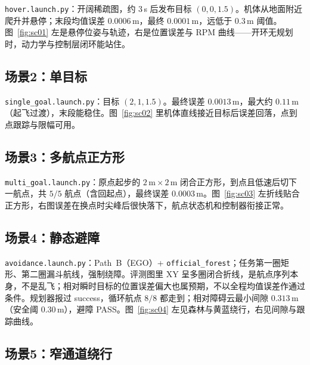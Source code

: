 \texttt{hover.launch.py}：开阔稀疏图，约 3\,s 后发布目标 $(0,0,1.5)$。机体从地面附近爬升并悬停；末段均值误差 $0.0006\,\mathrm{m}$，最终 $0.0001\,\mathrm{m}$，远低于 $0.3\,\mathrm{m}$ 阈值。图~\ref{fig:sc01} 左是悬停位姿与轨迹，右是位置误差与 RPM 曲线——开环无规划时，动力学与控制层闭环能站住。


\subsection{场景2：单目标}

\texttt{single\_goal.launch.py}：目标 $(2,1,1.5)$。最终误差 $0.0013\,\mathrm{m}$，最大约 $0.11\,\mathrm{m}$（起飞过渡），末段能稳住。图~\ref{fig:sc02} 里机体直线接近目标后误差回落，点到点跟踪与限幅可用。


\subsection{场景3：多航点正方形}

\texttt{multi\_goal.launch.py}：原点起步的 $2\,\mathrm{m}\times2\,\mathrm{m}$ 闭合正方形，到点且低速后切下一航点，共 $5/5$ 航点（含回起点），最终误差 $0.0003\,\mathrm{m}$。图~\ref{fig:sc03} 左折线贴合正方形，右图误差在换点时尖峰后很快落下，航点状态机和控制器衔接正常。


\subsection{场景4：静态避障}

\texttt{avoidance.launch.py}：Path~B（EGO）+ \texttt{official\_forest}；任务第一圈矩形、第二圈漏斗航线，强制绕障。评测图里 XY 呈多圈闭合折线，是航点序列本身，不是乱飞；相对瞬时目标的位置误差偏大也属预期，不以全程均值误差作通过条件。规划器报过 success，循环航点 $8/8$ 都走到；相对障碍云最小间隙 $0.313\,\mathrm{m}$（安全阈 $0.30\,\mathrm{m}$），避障 PASS。图~\ref{fig:sc04} 左见森林与黄蓝绕行，右见间隙与跟踪曲线。


\subsection{场景5：窄通道绕行}

